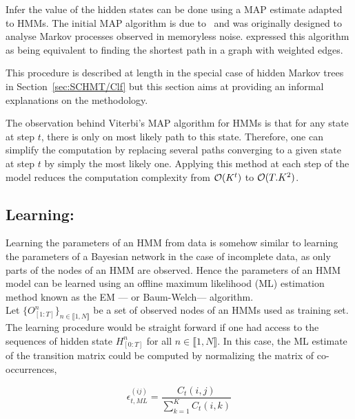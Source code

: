 \documentclass[a4paper,11pt]{report}
\begin{document}
      Infer the value of the hidden states can be done using a MAP estimate adapted to HMMs. The initial MAP  algorithm is due to~\citet{viterbi1967error} and was originally designed to analyse Markov processes observed in memoryless noise. \citet{forney1973viterbi} expressed this algorithm as being equivalent to finding the shortest path in a graph with weighted edges.\\
      
      \begin{note}
        This procedure is described at length in the special case of hidden Markov trees in Section~\ref{sec:SCHMT/Clf} but this section aims at providing an informal explanations on the methodology.\\
      \end{note}
      
      The observation behind Viterbi's MAP algorithm for HMMs is that for any state at step $t$, there is only on most likely path to this state. Therefore, one can simplify the computation by replacing several paths converging to a given state at step $t$ by simply the most likely one. Applying this method at each step of the model reduces the computation complexity from $\mathcal{O}(K^{t})$ to $\mathcal{O}(T.K^{2})$.\\
      
    \subsection{Learning:}
      \label{subsec:PGMs/MM/Learning}
      
      Learning the parameters of an HMM from data is somehow similar to learning the parameters of a Bayesian network in the case of incomplete data, as only parts of the nodes of an HMM are observed. Hence the parameters of an HMM model can be learned using an offline maximum likelihood (ML) estimation method known as the EM --- or Baum-Welch--- algorithm.\\
      
      Let $\{O_{[1:T]}^{n}\}_{n \in \llbracket 1,N \rrbracket}$ be a set of observed nodes of an HMMs used as training set. The learning procedure would be straight forward if one had access to the sequences of hidden state $H_{[0:T]}^{n}$ for all $n \in \llbracket 1,N \rrbracket$. In this case, the ML estimate of the transition matrix could be computed by normalizing the matrix of co-occurrences,
      
      \begin{equation}
        \epsilon_{t,ML}^{(ij)} = \frac{C_{t}(i,j)}{\sum_{k=1}^{K}C_{t}(i,k)}
        \label{eq:EM intuit transition}
      \end{equation}
      
\end{document}

